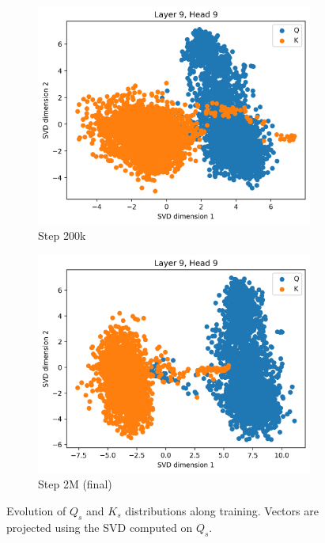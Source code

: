 \begin{figure}[ht]
    \begin{subfigure}[b]{0.24\linewidth}
         \includegraphics[width=\linewidth]{sources/part_1/anisotropy/imgs/dist_l9h9_s200_Q.png}
         \caption{Step 200k}
         \label{fig:dist_qk_s200_Q}
    \end{subfigure}
    \begin{subfigure}[b]{0.24\linewidth}
         \includegraphics[width=\linewidth]{sources/part_1/anisotropy/imgs/dist_l9h9_s2000_Q.png}
         \caption{Step 2M (final)}
         \label{fig:dist_qk_s2M_Q}
    \end{subfigure}
    \caption{Evolution of $Q_s$ and $K_s$ distributions along training. Vectors are projected using the SVD computed on $Q_s$.}
    \label{fig:proj_qk_heads_Q}
\end{figure}

